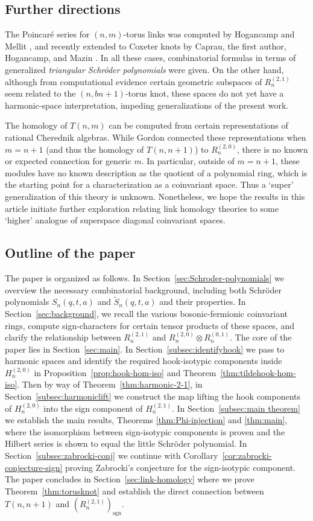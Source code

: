 \documentclass[11pt, noadjust, reqno]{amsart}
\theoremstyle{definition}
\theoremstyle{remark}
\numberwithin{equation}{section}
\newcommand{\0}{\emptyset}
\DeclareMathOperator{\sgn}{sgn}
\begin{document}
\subsection{Further directions} The Poincar\'e series for $(n,m)$-torus links was computed by Hogancamp and Mellit \cite{hog-mellit}, and recently extended to Coxeter knots by Caprau, the first author, Hogancamp, and Mazin \cite{CGHM}. 
In all these cases, combinatorial formulas in terms of generalized \emph{triangular Schr\"oder polynomials} were given. 
On the other hand, although from computational evidence certain geometric subspaces of $R_n^{(2,1)}$ seem related to the $(n,bn+1)$-torus knot, these spaces do not yet have a harmonic-space interpretation, impeding generalizations of the present work. 

The homology of $T(n,m)$ can be computed from certain representations of rational Cherednik algebras.
While Gordon \cite{Gordon} connected these representations when $m=n+1$ (and thus the homology of $T(n,n+1)$) to $R_n^{(2,0)}$, there is no known or expected connection for generic $m$.
In particular, outside of $m=n+1$, these modules have no known description as the quotient of a polynomial ring, which is the starting point for a characterization as a coinvariant space.
Thus a `super' generalization of this theory is unknown.
Nonetheless, we hope the results in this article initiate further exploration relating link homology theories to some `higher' analogue of superspace diagonal coinvariant spaces.


\subsection{Outline of the paper}
The paper is organized as follows. In Section~\ref{sec:Schroder-polynomials} we overview the necessary combinatorial background, including both  Schr\"oder polynomials $S_n(q,t,a)$ and $\widetilde{S}_n(q,t,a)$ and their properties. In Section~\ref{sec:background}, we recall the various bosonic-fermionic coinvariant rings, compute sign-characters for certain tensor products of these spaces, and clarify the relationship between $R_n^{(2,1)}$ and $R_n^{(2,0)}\otimes R_n^{(0,1)}$. The core of the paper lies in Section~\ref{sec:main}. In Section~\ref{subsec:identifyhook} we pass to harmonic spaces and identify the required hook-isotypic components inside $H_n^{(2,0)}$ in Proposition~\ref{prop:hook-hom-iso} and Theorem~\ref{thm:tildehook-hom-iso}. Then by way of Theorem~\ref{thm:harmonic-2-1}, in Section~\ref{subsec:harmoniclift} we construct the map lifting the hook components of $H_n^{(2,0)}$ into the sign component of $H_n^{(2,1)}$. In Section~\ref{subsec:main theorem} we establish the main results, Theorems \ref{thm:Phi-injection} and \ref{thm:main}, where the isomorphism between sign-isotypic components is proven and the Hilbert series is shown to equal the little Schr\"oder polynomial. In Section~\ref{subsec:zabrocki-conj} we continue with Corollary~\ref{cor:zabrocki-conjecture-sign} proving Zabrocki's conjecture for the sign-isotypic component. The paper concludes in Section~\ref{sec:link-homology} where we prove Theorem~\ref{thm:torusknot} and establish the direct connection between $T(n,n+1)$ and $(R_n^{(2,1)})_{\sgn}$.
\end{document}
